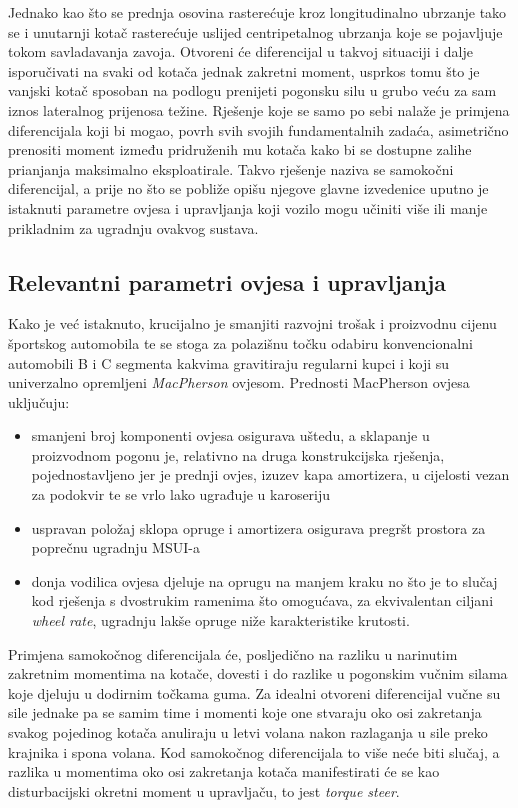 \documentclass[11pt]{article}
\numberwithin{equation}{section}%
\begin{document}
Jednako kao što se prednja osovina rasterećuje kroz longitudinalno ubrzanje tako se i unutarnji kotač rasterećuje uslijed centripetalnog ubrzanja koje se pojavljuje tokom savladavanja zavoja. Otvoreni će diferencijal u takvoj situaciji i dalje isporučivati na svaki od kotača jednak zakretni moment, usprkos tomu što je vanjski kotač sposoban na podlogu prenijeti pogonsku silu u grubo veću za sam iznos lateralnog prijenosa težine. Rješenje koje se samo po sebi nalaže je primjena diferencijala koji bi mogao, povrh svih svojih fundamentalnih zadaća, asimetrično prenositi moment između pridruženih mu kotača kako bi se dostupne zalihe prianjanja maksimalno eksploatirale. Takvo rješenje naziva se samokočni diferencijal, a prije no što se pobliže opišu njegove glavne izvedenice uputno je istaknuti parametre ovjesa i upravljanja koji vozilo mogu učiniti više ili manje prikladnim za ugradnju ovakvog sustava.

\subsection{Relevantni parametri ovjesa i upravljanja}

Kako je već istaknuto, krucijalno je smanjiti razvojni trošak i proizvodnu cijenu športskog automobila te se stoga za polazišnu točku odabiru konvencionalni automobili B i C segmenta kakvima gravitiraju regularni kupci i koji su univerzalno opremljeni \textit{MacPherson} ovjesom. Prednosti MacPherson ovjesa uključuju:
\begin{itemize}
\item smanjeni broj komponenti ovjesa osigurava uštedu, a sklapanje u proizvodnom pogonu je, relativno na druga konstrukcijska rješenja, pojednostavljeno jer je prednji ovjes, izuzev kapa amortizera, u cijelosti vezan za podokvir te se vrlo lako ugrađuje u karoseriju
\item uspravan položaj sklopa opruge i amortizera osigurava pregršt prostora za poprečnu ugradnju MSUI-a
\item donja vodilica ovjesa djeluje na oprugu na manjem kraku no što je to slučaj kod rješenja s dvostrukim ramenima što omogućava, za ekvivalentan ciljani \textit{wheel rate}, ugradnju lakše opruge niže karakteristike krutosti.
\end{itemize}

Primjena samokočnog diferencijala će, posljedično na razliku u narinutim zakretnim momentima na kotače, dovesti i do razlike u pogonskim vučnim silama koje djeluju u dodirnim točkama guma. Za idealni otvoreni diferencijal vučne su sile jednake pa se samim time i momenti koje one stvaraju oko osi zakretanja svakog pojedinog kotača anuliraju u letvi volana nakon razlaganja u sile preko krajnika i spona volana. Kod samokočnog diferencijala to više neće biti slučaj, a razlika u momentima oko osi zakretanja kotača manifestirati će se kao disturbacijski okretni moment u upravljaču, to jest \textit{torque steer}.
\end{document}
